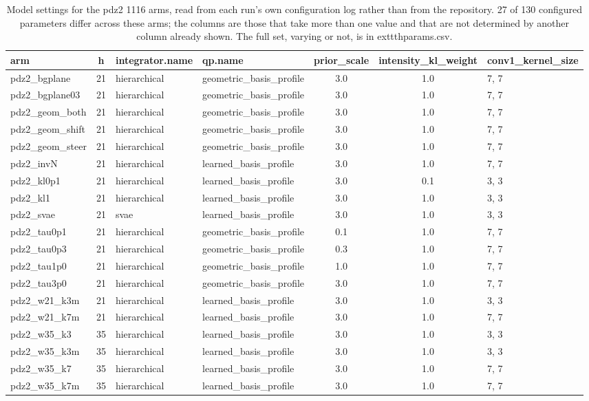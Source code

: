 \begin{table}[htbp]
\centering
\caption{Model settings for the pdz2 1116 arms, read from each run's own configuration log rather than from the repository. 27 of 130 configured parameters differ across these arms; the columns are those that take more than one value and that are not determined by another column already shown. The full set, varying or not, is in 	exttt{hparams.csv}.}
\label{tab:hyperparameters_pdz2_1116}
\small
\begin{tabular}{@{}l S[table-format=2.0] l l S[table-format=1.1] S[table-format=1.1] l@{}}
\toprule
{arm} & {h} & {integrator.name} & {qp.name} & {prior\_scale} & {intensity\_kl\_weight} & {conv1\_kernel\_size} \\
\midrule
{pdz2\_bgplane} & 21 & {hierarchical} & {geometric\_basis\_profile} & 3.0 & 1.0 & {7, 7} \\
{pdz2\_bgplane03} & 21 & {hierarchical} & {geometric\_basis\_profile} & 3.0 & 1.0 & {7, 7} \\
{pdz2\_geom\_both} & 21 & {hierarchical} & {geometric\_basis\_profile} & 3.0 & 1.0 & {7, 7} \\
{pdz2\_geom\_shift} & 21 & {hierarchical} & {geometric\_basis\_profile} & 3.0 & 1.0 & {7, 7} \\
{pdz2\_geom\_steer} & 21 & {hierarchical} & {geometric\_basis\_profile} & 3.0 & 1.0 & {7, 7} \\
{pdz2\_invN} & 21 & {hierarchical} & {learned\_basis\_profile} & 3.0 & 1.0 & {7, 7} \\
{pdz2\_kl0p1} & 21 & {hierarchical} & {learned\_basis\_profile} & 3.0 & 0.1 & {3, 3} \\
{pdz2\_kl1} & 21 & {hierarchical} & {learned\_basis\_profile} & 3.0 & 1.0 & {3, 3} \\
{pdz2\_svae} & 21 & {svae} & {learned\_basis\_profile} & 3.0 & 1.0 & {3, 3} \\
{pdz2\_tau0p1} & 21 & {hierarchical} & {geometric\_basis\_profile} & 0.1 & 1.0 & {7, 7} \\
{pdz2\_tau0p3} & 21 & {hierarchical} & {geometric\_basis\_profile} & 0.3 & 1.0 & {7, 7} \\
{pdz2\_tau1p0} & 21 & {hierarchical} & {geometric\_basis\_profile} & 1.0 & 1.0 & {7, 7} \\
{pdz2\_tau3p0} & 21 & {hierarchical} & {geometric\_basis\_profile} & 3.0 & 1.0 & {7, 7} \\
{pdz2\_w21\_k3m} & 21 & {hierarchical} & {learned\_basis\_profile} & 3.0 & 1.0 & {3, 3} \\
{pdz2\_w21\_k7m} & 21 & {hierarchical} & {learned\_basis\_profile} & 3.0 & 1.0 & {7, 7} \\
{pdz2\_w35\_k3} & 35 & {hierarchical} & {learned\_basis\_profile} & 3.0 & 1.0 & {3, 3} \\
{pdz2\_w35\_k3m} & 35 & {hierarchical} & {learned\_basis\_profile} & 3.0 & 1.0 & {3, 3} \\
{pdz2\_w35\_k7} & 35 & {hierarchical} & {learned\_basis\_profile} & 3.0 & 1.0 & {7, 7} \\
{pdz2\_w35\_k7m} & 35 & {hierarchical} & {learned\_basis\_profile} & 3.0 & 1.0 & {7, 7} \\
\bottomrule
\end{tabular}
\end{table}
